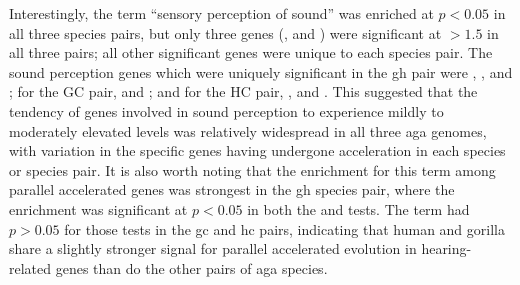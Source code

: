 Interestingly, the term ``sensory perception of sound'' was enriched
at $p<0.05$ in all three species pairs, but only three genes
(,  and ) were significant at
\lrtmin$>1.5$ in all three pairs; all other significant genes were
unique to each species pair. The sound perception genes which were
uniquely significant in the \ac{gh} pair were ,
,  and ; for the GC pair,
 and ; and for the HC pair, ,
 and . This suggested that the tendency of
genes involved in sound perception to experience mildly to moderately
elevated \dnds levels was relatively widespread in all three \ac{aga}
genomes, with variation in the specific genes having undergone
acceleration in each species or species pair. It is also worth noting
that the enrichment for this term among parallel accelerated genes was
strongest in the \ac{gh} species pair, where the enrichment was
significant at $p<0.05$ in both the \topgo and \goseq tests. The term
had $p>0.05$ for those tests in the \ac{gc} and \ac{hc} pairs,
indicating that human and gorilla share a slightly stronger signal for
parallel accelerated evolution in hearing-related genes than do the
other pairs of \ac{aga} species.

